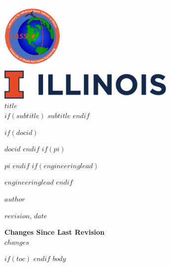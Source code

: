 \documentclass[11pt, twoside]{article}
\title{}
\author{}
\begin{document}
\thispagestyle{empty}
\begin{center}
	\includegraphics[width=3cm]{lassi-logo.jpg}\\
	\includegraphics[height=1.5cm]{Illinois-Wordmark-Horizontal-Full-Color-RGB.png}\\
	\vspace{10mm}
	{\huge \textbf{$title$}}\\
	\vspace{2.5mm}
	$if(subtitle)$
	{\Large $subtitle$}
	$endif$
\end{center}
\vspace{12mm}
\large{
\begin{description}
	$if(docid)$
	\item [Document ID] $docid$
	$endif$
	$if(pi)$
	\item [Principal Investigator] $pi$
	$endif$
	$if(engineeringlead)$
	\item [Engineering Lead] $engineeringlead$
	$endif$
	\item [Document Maintainer] $author$
	\item [Revision] $revision$, $date$
\end{description}
\textbf{Changes Since Last Revision}\\
$changes$
}
\newpage
$if(toc)$
\setcounter{tocdepth}{$toc-depth$}
\tableofcontents
\newpage
$endif$
$body$
\end{document}
